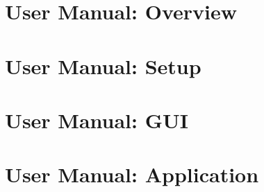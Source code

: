 \chapter[DABC User Manual: Overview]{\dabc\ User Manual: Overview}
 \cleardoublepage
\chapter[DABC User Manual: Setup]{\dabc\ User Manual: Setup}
 \cleardoublepage
\chapter[DABC User Manual: GUI]{\dabc\ User Manual: GUI}
 \cleardoublepage
\chapter[DABC User Manual: Application MBS]{\dabc\ User Manual: Application \mbs}
 \cleardoublepage

